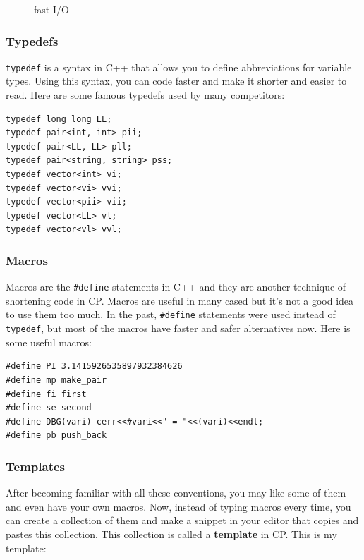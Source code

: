 \documentclass[12pt, a4paper]{article}
\begin{document}
\begin{figure}[h]
\caption{fast I/O}
\end{figure}

\subsubsection{Typedefs}
\lstinline{typedef} is a syntax in C++ that allows you to define abbreviations for variable types. Using this syntax, you can code faster and make it shorter and easier to read. Here are some famous typedefs used by many competitors:
\begin{lstlisting}
typedef long long LL;
typedef pair<int, int> pii;
typedef pair<LL, LL> pll;
typedef pair<string, string> pss;
typedef vector<int> vi;
typedef vector<vi> vvi;
typedef vector<pii> vii;
typedef vector<LL> vl;
typedef vector<vl> vvl;
\end{lstlisting}

\subsubsection{Macros}
Macros are the \lstinline{#define} statements in C++ and they are another technique of shortening code in CP. Macros are useful in many cased but it's not a good idea to use them too much. In the past, \lstinline{#define} statements were used instead of \lstinline{typedef}, but most of the macros have faster and safer alternatives now. Here is some useful macros:
\begin{lstlisting}
#define PI 3.1415926535897932384626
#define mp make_pair
#define fi first
#define se second
#define DBG(vari) cerr<<#vari<<" = "<<(vari)<<endl;
#define pb push_back
\end{lstlisting}

\subsubsection{Templates}
After becoming familiar with all these conventions, you may like some of them and even have your own macros. Now, instead of typing macros every time, you can create a collection of them and make a snippet in your editor that copies and pastes this collection. This collection is called a \textbf{template} in CP. This is my template:
\end{document}
